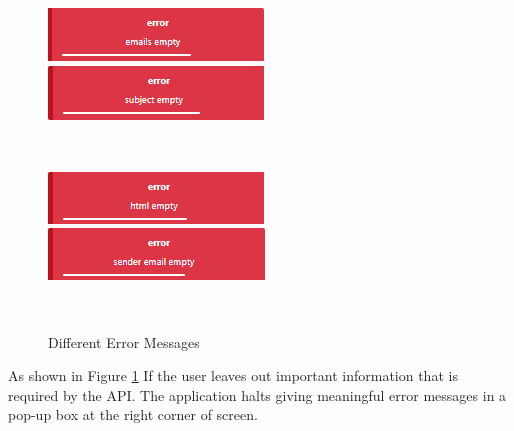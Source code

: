\begin{figure}[H]
\centering
\begin{minipage}[c]{.5\textwidth}
  \centering
  \includegraphics[width=.9\linewidth]{figures/frontend_error_1.png}
\end{minipage}\hfill
\begin{minipage}[c]{.5\textwidth}
  \centering
  \includegraphics[width=.9\linewidth]{figures/frontend_errors_2.png}
\end{minipage}\\
\vspace{0.3cm}

\begin{minipage}[c]{.5\textwidth}
  \centering
  \includegraphics[width=.9\linewidth]{figures/frontend_errors_3.png}
\end{minipage}%
\begin{minipage}[c]{.5\textwidth}
  \centering
  \includegraphics[width=.9\linewidth]{figures/frontend_errors_4.png}
\end{minipage}\\
\caption{Different Error Messages}
\label{fig:different-errors}
\end{figure}

As shown in Figure \ref{fig:different-errors} If the user leaves out important information that is required by the API. The application halts giving meaningful error messages in a pop-up box at the right corner of screen. 

